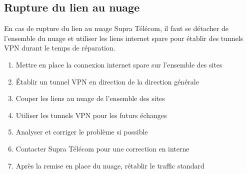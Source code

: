 \documentclass{article}
\newcommand{\spr}{Supra Télécom\xspace}
\begin{document}
\subsection{Rupture du lien au nuage}

En cas de rupture du lien au nuage \spr, il faut se détacher de l'ensemble du nuage et utiliser les liens internet spare pour établir des tunnels VPN durant le temps de réparation.

\bigskip

\begin{enumerate}
  \item Mettre en place la connexion internet spare sur l'ensemble des sites
  \item Établir un tunnel VPN en direction de la direction générale
  \item Couper les liens au nuage de l'ensemble des sites
  \item Utiliser les tunnels VPN pour les futurs échanges
  \item Analyser et corriger le problème si possible
  \item Contacter \spr pour une correction en interne
  \item Après la remise en place du nuage, rétablir le traffic standard
\end{enumerate}
\end{document}
